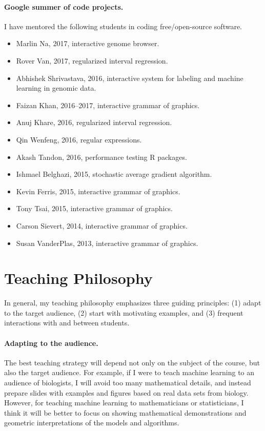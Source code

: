 \documentclass{article}
\begin{document}
\paragraph{Google summer of code projects.} I have mentored the
following students in coding free/open-source software.
\begin{itemize}
\item Marlin Na, 2017, interactive genome browser.
\item Rover Van, 2017, regularized interval regression.
\item Abhishek Shrivastava, 2016, interactive system for labeling and
  machine learning in genomic data.
\item Faizan Khan, 2016--2017, interactive grammar of graphics.
\item Anuj Khare, 2016, regularized interval regression.
\item Qin Wenfeng, 2016, regular expressions.
\item Akash Tandon, 2016, performance testing R packages.
\item Ishmael Belghazi, 2015, stochastic average gradient algorithm.
\item Kevin Ferris, 2015, interactive grammar of graphics.
\item Tony Tsai, 2015, interactive grammar of graphics.
\item Carson Sievert, 2014, interactive grammar of graphics.
\item Susan VanderPlas, 2013, interactive grammar of graphics.
\end{itemize}

\section{Teaching Philosophy}

In general, my teaching philosophy emphasizes three guiding
principles: (1) adapt to the target audience, (2) start with
motivating examples, and (3) frequent interactions with and between
students.

\paragraph{Adapting to the audience.} The best teaching strategy will
depend not only on the subject of the course, but also the target
audience. For example, if I were to teach machine learning to an
audience of biologists, I will avoid too many mathematical details,
and instead prepare slides with examples and figures based on real
data sets from biology. However, for teaching machine learning to
mathematicians or statisticians, I think it will be better to focus on
showing mathematical demonstrations and geometric interpretations of
the models and algorithms.
\end{document}
